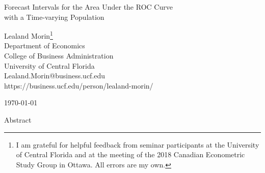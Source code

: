 



\begin{center}
\vspace{3.0in}


{\Large
Forecast Intervals for the Area Under the ROC Curve \\
with a Time-varying Population \\
}

\vspace{0.75in}


{\large{Lealand Morin\footnote{I am grateful for helpful feedback
from seminar participants at
the University of Central Florida and at the meeting of the 2018 Canadian Econometric Study Group in Ottawa. %
All errors are my own. } \\
Department of Economics \\
%
College of Business Administration \\
University of Central Florida \\
Lealand.Morin@business.ucf.edu \\
https://business.ucf.edu/person/lealand-morin/ }}




\vspace{0.5in}

\today

\vspace{0.50in}



{\large{Abstract}}  \\
\vspace{0.25in}

\end{center}

